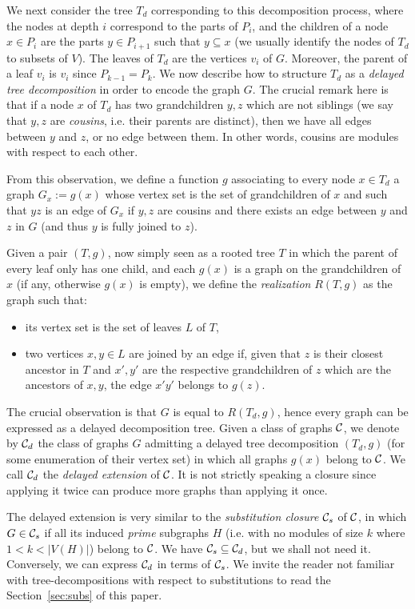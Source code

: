 \documentclass[11pt]{article}
\numberwithin{equation}{section}
\begin{document}
We next consider the tree $T_d$ corresponding to this decomposition process, where the nodes at depth $i$ correspond to the parts of $P_i$, and the children of a node $x\in P_i$ are the parts $y\in P_{i+1}$ such that $y\subseteq x$ (we usually identify the nodes of $T_d$ to subsets of $V$). The leaves of $T_d$ are the vertices $v_i$ of $G$. Moreover, the parent of a leaf $v_i$ is $v_i$ since $P_{k-1}=P_k$. We now describe how to structure $T_d$ as a \emph{delayed tree decomposition} in order to encode the graph $G$. The crucial remark here is that if a node $x$ of $T_d$ has two grandchildren $y,z$ which are not siblings (we say that $y,z$ are \emph{cousins}, i.e. their parents are distinct), then we have all edges between $y$ and $z$, or no edge between them. In other words, cousins are modules with respect to each other.

From this observation, we define a function $g$ associating to every node $x\in T_d$ a graph $G_x:=g(x)$ whose vertex set is the set of  grandchildren of $x$ and such that $yz$ is an edge of $G_x$ if $y,z$ are cousins and there exists an edge between $y$ and $z$ in $G$ (and thus $y$ is fully joined to $z$). 

Given a pair $(T,g)$, now simply seen as a rooted tree $T$ in which the parent of every leaf only has one child, and each $g(x)$ is a graph on the grandchildren of $x$ (if any, otherwise $g(x)$ is empty), we define the \emph{realization} $R(T,g)$ as the graph such that: 
\begin{itemize}
    \item its vertex set is the set of leaves $L$ of $T$,
    \item two vertices $x,y\in L$ are joined by an edge if, given that $z$ is their closest ancestor in $T$ and $x',y'$ are the respective grandchildren of $z$ which are the ancestors of $x,y$, the edge $x'y'$ belongs to $g(z)$.
\end{itemize}

The crucial observation is that $G$ is equal to $R(T_d,g)$, hence every graph can be expressed as a delayed decomposition tree. Given a class of graphs $\cal C$, we denote by ${\cal C}_d$ the class of graphs $G$ admitting a delayed tree decomposition $(T_d,g)$ (for some enumeration of their vertex set) in which all graphs $g(x)$ belong to $\cal C$. We call ${\cal C}_d$ the \emph{delayed extension} of $\cal C$. It is not strictly speaking a closure since applying it twice can produce more graphs than applying it once.

The delayed extension is very similar to the \emph{substitution closure} ${\cal C}_s$ of $\cal C$, in which $G\in {\cal C}_s$ if all its induced \emph{prime} subgraphs $H$ (i.e. with no modules of size $k$ where $1<k<|V(H)|$) belong to $\cal C$. We have ${\cal C}_s\subseteq {\cal C}_d$, but we shall not need it. Conversely, we can express ${\cal C}_d$ in terms of ${\cal C}_s$. We invite the reader not familiar with tree-decompositions with respect to substitutions to read the Section~\ref{sec:subs} of this paper.
\end{document}
